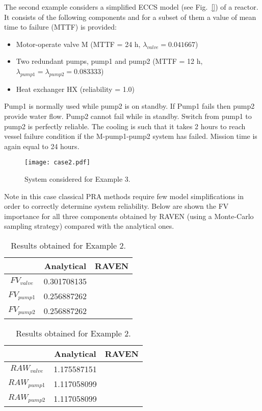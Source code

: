 The second example considers a simplified ECCS model (see Fig.~\ref{}) of a reactor. 
It consists of the following components and for a subset of them a 
value of mean time to failure (MTTF) is provided:
\begin{itemize}
  \item Motor-operate valve M (MTTF = 24 h, $\lambda_{valve} = 0.041667$)
  \item Two redundant pumps, pump1 and pump2 
        (MTTF = 12 h, $\lambda_{pump1} = \lambda_{pump2} = 0.083333$)
  \item Heat exchanger HX (reliability = 1.0)
\end{itemize}

Pump1 is normally used while pump2 is on standby. If Pump1 fails then pump2 provide water flow. 
Pump2 cannot fail while in standby. Switch from pump1 to pump2 is perfectly reliable. 
The cooling is such that it takes 2 hours to reach vessel failure condition if the 
M-pump1-pump2 
system has failed. Mission time is again equal to 24 hours.

\begin{figure}
    \centering
    \centerline{\texttt{[image: case2.pdf]}}
    \caption{System considered for Example 3.}
    \label{fig:example3}
\end{figure}

Note in this case classical PRA methods require few model simplifications in order to correctly 
determine system reliability.
Below are shown the FV importance for all three components obtained by RAVEN (using a Monte-Carlo 
sampling strategy) compared with the analytical ones.

\begin{table}
    \caption{Results obtained for Example 2.}
    \begin{minipage}{.5\linewidth}
      \centering
      \begin{tabular}{c | c | c } 
        \hline 
         & Analytical & RAVEN \\ 
        \hline 
        $FV_{valve}$ & 0.301708135 &   \\
        $FV_{pump1}$ & 0.256887262 &   \\
        $FV_{pump2}$ & 0.256887262 &   \\
        \hline 
      \end{tabular}
    \end{minipage}%
    \begin{minipage}{.5\linewidth}
      \centering
      \begin{tabular}{c | c | c } 
        \hline 
         & Analytical & RAVEN \\ 
        \hline 
        $RAW_{valve}$ & 1.175587151 &   \\
        $RAW_{pump1}$ & 1.117058099 &   \\
        $RAW_{pump2}$ & 1.117058099 &   \\
        \hline 
      \end{tabular}
    \end{minipage} 
\end{table}


